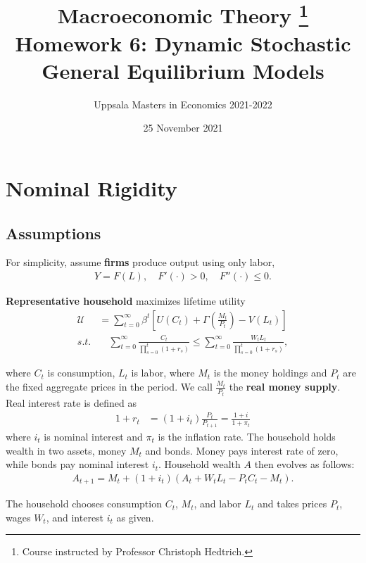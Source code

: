 \documentclass{article}
\title{ Macroeconomic Theory
        \thanks{Course instructed by Professor Christoph Hedtrich.} \\
        Homework 6: Dynamic Stochastic General Equilibrium Models
        }
\author{
        Uppsala Masters in Economics 2021-2022
        }
\date{25 November 2021}
\newcommand{\?}{\textcolor{red}{(?)}} %
\begin{document}
    
    \maketitle
    
    \section{Nominal Rigidity}
    
    \subsection{Assumptions}
        
        For simplicity, assume \textbf{firms} produce output using only labor,
        \begin{align}
            Y = F(L), \quad F'(\cdot) > 0, \quad F''(\cdot) \le 0.
        \end{align}
        
        \textbf{Representative household} maximizes lifetime utility
        \begin{align}
            \mathcal{U} &= \sum_{t=0}^\infty \beta^t
            \left[
                U(C_t) + \Gamma\left(\frac{M_t}{P_t}\right) - V(L_t)
            \right]
            \\
            s.t. & \quad \sum_{t=0}^\infty \frac{C_t}{\prod_{s=0}^{t}(1+r_s)}
            \le \sum_{t=0}^\infty \frac{W_t L_t}{\prod_{s=0}^{t}(1+r_s)},
        \end{align}
        
        where $C_t$ is consumption, $L_t$ is labor, where $M_t$ is the money holdings and $P_t$ are the fixed aggregate prices in the period. We call $\frac{M_t}{P_t}$ the \textbf{real money supply}. Real interest rate is defined as
        \begin{align}
            1 + r_t &= (1+i_t)\frac{P_t}{P_{t+1}}
            = \frac{1+i}{1+\pi_t}
        \end{align}
        where $i_t$ is nominal interest and $\pi_t$ is the inflation rate. The household holds wealth in two assets, money $M_t$ and bonds. Money pays interest rate of zero, while bonds pay nominal interest $i_t$. Household wealth $A$ then evolves as follows:
        \begin{align}
            A_{t+1} = M_t + (1+i_t)(A_t + W_t L_t - P_t C_t - M_t).
        \end{align}
        
        The household chooses consumption $C_t$, $M_t$, and labor $L_t$ and takes prices $P_t$, wages $W_t$, and interest $i_t$ as given.
        
\end{document}
